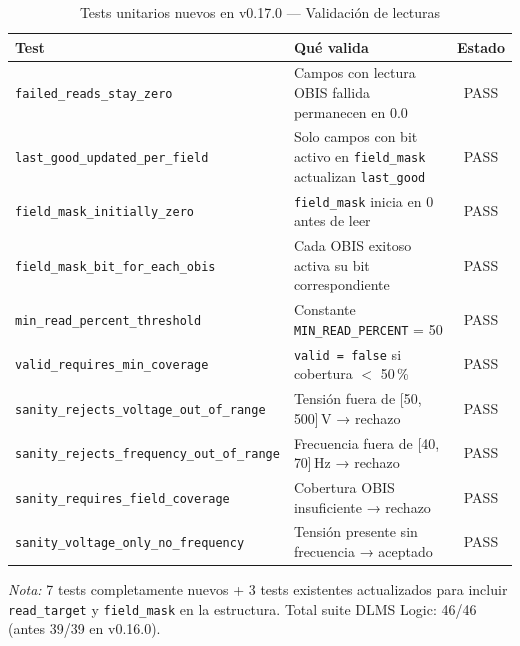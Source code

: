 
\begin{table}[htbp]
\centering
\caption{Tests unitarios nuevos en v0.17.0 — Validación de lecturas}
\label{tab:new-tests-v017}
\small
\begin{tabular}{l p{6.5cm} c}
\toprule
\textbf{Test} & \textbf{Qué valida} & \textbf{Estado} \\
\midrule
\texttt{failed\_reads\_stay\_zero}
  & Campos con lectura OBIS fallida permanecen en 0.0
  & \textcolor{green!60!black}{PASS} \\
\addlinespace
\texttt{last\_good\_updated\_per\_field}
  & Solo campos con bit activo en \texttt{field\_mask} actualizan \texttt{last\_good}
  & \textcolor{green!60!black}{PASS} \\
\addlinespace
\texttt{field\_mask\_initially\_zero}
  & \texttt{field\_mask} inicia en 0 antes de leer
  & \textcolor{green!60!black}{PASS} \\
\addlinespace
\texttt{field\_mask\_bit\_for\_each\_obis}
  & Cada OBIS exitoso activa su bit correspondiente
  & \textcolor{green!60!black}{PASS} \\
\addlinespace
\texttt{min\_read\_percent\_threshold}
  & Constante \texttt{MIN\_READ\_PERCENT} = 50
  & \textcolor{green!60!black}{PASS} \\
\addlinespace
\texttt{valid\_requires\_min\_coverage}
  & \texttt{valid = false} si cobertura $<$ 50\,\%
  & \textcolor{green!60!black}{PASS} \\
\addlinespace
\texttt{sanity\_rejects\_voltage\_out\_of\_range}
  & Tensión fuera de [50, 500]\,V → rechazo
  & \textcolor{green!60!black}{PASS} \\
\addlinespace
\texttt{sanity\_rejects\_frequency\_out\_of\_range}
  & Frecuencia fuera de [40, 70]\,Hz → rechazo
  & \textcolor{green!60!black}{PASS} \\
\addlinespace
\texttt{sanity\_requires\_field\_coverage}
  & Cobertura OBIS insuficiente → rechazo
  & \textcolor{green!60!black}{PASS} \\
\addlinespace
\texttt{sanity\_voltage\_only\_no\_frequency}
  & Tensión presente sin frecuencia → aceptado
  & \textcolor{green!60!black}{PASS} \\
\bottomrule
\end{tabular}

\smallskip
\footnotesize
\textit{Nota:} 7 tests completamente nuevos + 3 tests existentes actualizados
para incluir \texttt{read\_target} y \texttt{field\_mask} en la estructura.
Total suite DLMS Logic: 46/46 (antes 39/39 en v0.16.0).
\end{table}
